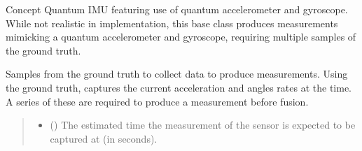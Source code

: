 \documentclass[letterpaper,10pt,english]{sphinxmanual}
\begin{document}
\begin{fulllineitems}
\label{\detokenize{modules/quantum/base:qnav.quantum.base.ConceptQuantumImu}}
\pysigstartsignatures
{}
\pysigstopsignatures
\sphinxAtStartPar
Concept Quantum IMU featuring use of quantum accelerometer and gyroscope.
While not realistic in implementation, this base class produces
measurements mimicking a quantum accelerometer and gyroscope,
requiring multiple samples of the ground truth.

\begin{fulllineitems}
\label{\detokenize{modules/quantum/base:qnav.quantum.base.ConceptQuantumImu.take_measurement}}
\pysigstartsignatures
{}
\pysigstopsignatures
\sphinxAtStartPar
Samples from the ground truth to collect data to produce measurements.
Using the ground truth, captures the current acceleration and angles
rates at the time. A series of these are required to produce a
measurement before fusion.
\begin{quote}\begin{description}
\begin{itemize}
\item {} 
\sphinxAtStartPar
{} () \textendash{} The estimated time the measurement of the sensor
is expected to be captured at (in seconds).


\end{itemize}
\end{description}
\end{quote}
\end{fulllineitems}
\end{fulllineitems}
\end{document}
